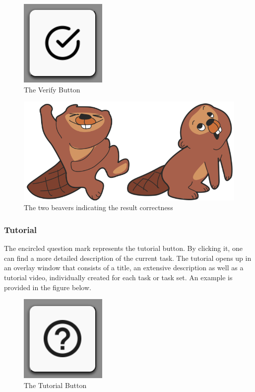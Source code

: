 \begin{figure}[H]
    \centering
    \includegraphics[width=0.2 \columnwidth]{figures/check.png}
    \caption{The Verify Button} 
    \label{fig:next} 
\end{figure}

\begin{figure}[H]
    \centering
    \includegraphics[width=0.7 \columnwidth]{figures/evaluation_result.png}
    \caption{The two beavers indicating the result correctness} 
    \label{fig:beavers}
\end{figure}

\subsubsection{Tutorial}
\label{subsubsection:tutorial}
The encircled question mark represents the tutorial button. By clicking it, one can find a more detailed description of the current task. The tutorial opens up in an overlay window that consists of a title, an extensive description as well as a tutorial video, individually created for each task or task set. An example is provided in the figure below.

\begin{figure}[H]
    \centering
    \includegraphics[width=0.2 \columnwidth]{figures/tutorial.png}
    \caption{The Tutorial Button} 
    \label{fig:tutorial} 
\end{figure}

